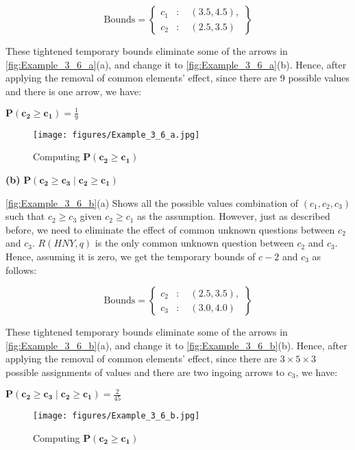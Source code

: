 \begin{example}
\[
    \text{Bounds} = 
    \left\{ 
    \begin{array}{ll}
    c_1 & : \quad (3.5, 4.5), \\ 
    c_2 & : \quad (2.5, 3.5)
    \end{array}
    \right\}
\]

These tightened temporary bounds eliminate some of the arrows in \autoref{fig:Example_3_6_a}(a), and change it to \autoref{fig:Example_3_6_a}(b). Hence, after applying the removal of common elements' effect, since there are 9 possible values and there is one arrow, we have:

\(\mathbf{P(c_2 \geq c_1)} = \frac{1}{9}\)


\begin{figure}[ht]
    \centering
    \texttt{[image: figures/Example\_3\_6\_a.jpg]}
    \caption{Computing \(\mathbf{P(c_2 \geq c_1)}\)}
    \label{fig:Example_3_6_b}
\end{figure}

\textbf{(b)} \(\mathbf{P(c_2 \geq c_3 \mid c_2 \geq c_1)}\)

\autoref{fig:Example_3_6_b}(a) Shows all the possible values combination of $(c_1, c_2, c_3)$ such that $c_2 \geq c_3$ given $c_2 \geq c_1$ as the assumption. However, just as described before, we need to eliminate the effect of common unknown questions between $c_2$ and $c_3$. $R(HNY, q)$ is the only common unknown question between $c_2$ and $c_3$. Hence, assuming it is zero, we get the temporary bounds of $c-2$ and $c_3$ as follows:

\[
    \text{Bounds} = 
    \left\{ 
    \begin{array}{ll}
    c_2 & : \quad (2.5, 3.5), \\ 
    c_3 & : \quad (3.0, 4.0)
    \end{array}
    \right\}
\]

These tightened temporary bounds eliminate some of the arrows in \autoref{fig:Example_3_6_b}(a), and change it to \autoref{fig:Example_3_6_b}(b). Hence, after applying the removal of common elements' effect, since there are $3 \times 5 \times 3$ possible assignments of values and there are two ingoing arrows to $c_3$, we have:

\(\mathbf{P(c_2 \geq c_3 \mid c_2 \geq c_1)} = \frac{2}{45}\)


\begin{figure}[ht]
    \centering
    \texttt{[image: figures/Example\_3\_6\_b.jpg]}
    \caption{Computing \(\mathbf{P(c_2 \geq c_1)}\)}
    \label{fig:Example_3_6_a}
\end{figure}


\end{example}
